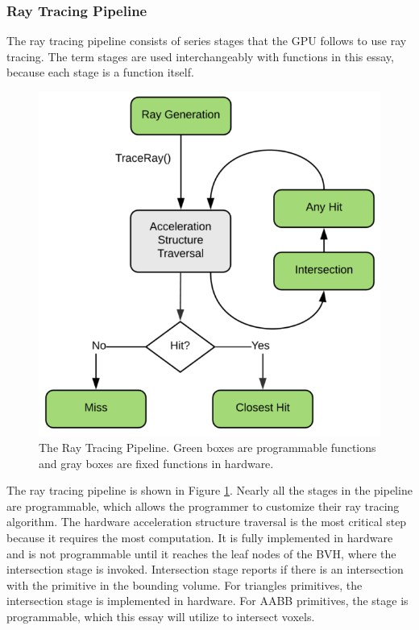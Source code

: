 \documentclass[12pt]{article}
\begin{document}
\subsubsection{Ray Tracing Pipeline}

The ray tracing pipeline consists of series stages that the GPU follows to use ray tracing.
The term stages are used interchangeably with functions in this essay, because each stage is a function itself.

\begin{figure}[H]
    \begin{center}
        \includegraphics[scale=0.5]{RayTracing-Pipeline}
    \end{center}
    \caption{
        The Ray Tracing Pipeline.
        Green boxes are programmable functions and gray boxes are fixed functions in hardware.
        \parencite{NVIDIA:DXR-Intro}
    }
    \label{fig:RayTracing-Pipeline}
\end{figure}

The ray tracing pipeline is shown in Figure \ref{fig:RayTracing-Pipeline}.
Nearly all the stages in the pipeline are programmable, which allows the programmer to customize their ray tracing algorithm.
The hardware acceleration structure traversal is the most critical step because it requires the most computation.
It is fully implemented in hardware and is not programmable until it reaches the leaf nodes of the BVH, where the intersection stage is invoked.
Intersection stage reports if there is an intersection with the primitive in the bounding volume.
For triangles primitives, the intersection stage is implemented in hardware.
For AABB primitives, the stage is programmable, which this essay will utilize to intersect voxels.
\end{document}
